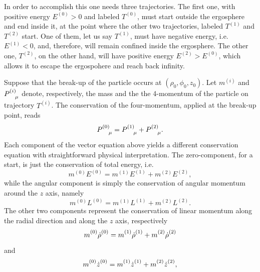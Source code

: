 In order to accomplish this one needs three trajectories. The first one, with positive energy $E^{(0)} > 0$ and labeled $T^{(0)}$, must start outside the ergosphere and end inside it, at the point where the other two trajectories, labeled $T^{(1)}$ and $T^{(2)}$ start. One of them, let us say $T^{(1)}$, must have negative energy, i.e.~$E^{(1)}<0$, and, therefore, will remain confined inside the ergosphere. The other one, $T^{(2)}$, on the other hand, will have positive energy $E^{(2)} > E^{(0)}$, which allows it to escape the ergospohere and reach back infinity.

Suppose that the break-up of the particle occurs at $(\rho_0,\phi_0,z_0)$. Let $m^{(i)}$ and $\tens{P}{(i)}{\mu}$ denote, respectively, the mass and the the 4-momentum of the particle on trajectory $T^{(i)}$. The conservation of the four-momentum, applied at the break-up point, reads
\begin{equation}
  \tens{P}{(0)}{\mu} = \tens{P}{(1)}{\mu} + \tens{P}{(2)}{\mu}.
  \label{ch:penrose_binaries/eq:four_momentum_conservation}
\end{equation}
%
Each component of the vector equation above yields a different conservation equation with straightforward physical interpretation. The zero-component, for a start, is just the conservation of total energy, i.e.
\begin{equation}
  m^{(0)}E^{(0)} = m^{(1)}E^{(1)} + m^{(2)}E^{(2)},
  \label{ch:penrose_binaries/eq:conservation_of_charge_energy}
\end{equation}
while the angular component is simply the conservation of angular momentum around the $z$ axis, namely
\begin{equation}
  m^{(0)}L^{(0)} = m^{(1)}L^{(1)} + m^{(2)}L^{(2)}.
  \label{ch:penrose_binaries/eq:conservation_ang_mom}
\end{equation}
The other two components represent the conservation of linear momentum along the radial direction and along the $z$ axis, respectively
\begin{equation}
  \tens{m}{(0)}{}\tens{\dot{\rho}}{(0)}{} = \tens{m}{(1)}{}\tens{\dot{\rho}}{(1)}{} + \tens{m}{(2)}{}\tens{\dot{\rho}}{(2)}{}
  \label{ch:penrose_binaries/eq:conservation_rho}
\end{equation}
%
and
%
\begin{equation}
  \tens{m}{(0)}{}\tens{\dot{z}}{(0)}{} = \tens{m}{(1)}{}\tens{\dot{z}}{(1)}{} + \tens{m}{(2)}{}\tens{\dot{z}}{(2)}{},
  \label{ch:penrose_binaries/eq:conservation_z}
\end{equation}

